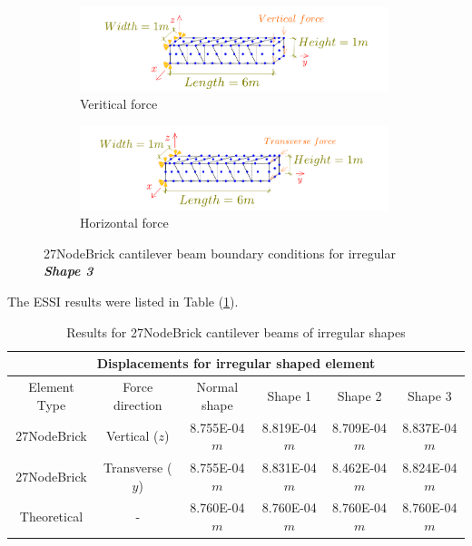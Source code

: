 \documentclass[fleqn,11pt,letter]{article}
\begin{document}
\begin{figure}[H]
  \centering
    \begin{subfigure}{0.5\textwidth}
      \centering
      \includegraphics[width=9cm]{../Figure_files/27NodeBrick/beam_brick27_shape3_vertical.pdf}
      \caption{Veritical force}
    \end{subfigure}
    \begin{subfigure}{0.5\textwidth}
      \centering
      \includegraphics[width=9cm]{../Figure_files/27NodeBrick/beam_brick27_shape3_horizontal.pdf}
      \caption{Horizontal force}
    \end{subfigure}
  \caption{27NodeBrick cantilever beam boundary conditions for irregular \textbf{\emph{Shape 3}} }
  \label{fig 27NodeBrick cantilever beam boundary conditions shape 3}
\end{figure}


The ESSI results were listed in Table (\ref{table Results for 27NodeBrick cantilever beams of irregular shapes}). 
\begin{table}[H]
  \centering
  \caption{Results for 27NodeBrick cantilever beams of irregular shapes}
  \label{table Results for 27NodeBrick cantilever beams of irregular shapes}
  \begin{tabular}{|c|c|c|c|c|c|}
    \hline 
    \multicolumn{6}{|c|}{Displacements for irregular shaped element}   \\ \hline
    Element Type   & Force direction & Normal shape & Shape 1 & Shape 2 & Shape 3  \\ \hline 
    27NodeBrick     & Vertical ($z$)     & 8.755E-04 $m$  & 8.819E-04 $m$ & 8.709E-04 $m$ & 8.837E-04 $m$   \\ \hline
    27NodeBrick     & Transverse ($y$)   & 8.755E-04 $m$  & 8.831E-04 $m$ & 8.462E-04 $m$ & 8.824E-04 $m$   \\ \hline
    Theoretical    &      -              & 8.760E-04 $m$  & 8.760E-04 $m$ & 8.760E-04 $m$ & 8.760E-04 $m$ \\ \hline
  \end{tabular}
\end{table}
\end{document}
